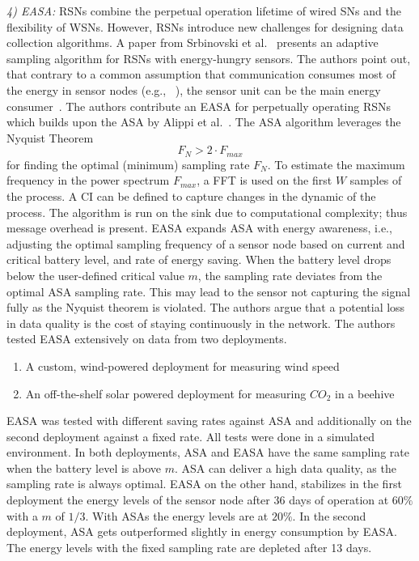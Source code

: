 \textit{4) \ac{EASA}:}
\acp{RSN} combine the perpetual operation lifetime of wired \acp{SN} and the
flexibility of \acp{WSN}. However, \acp{RSN} introduce new challenges for
designing data collection algorithms. A paper from Srbinovski et
al.~\cite{srbinovski2016energy} presents an adaptive sampling algorithm for
\acp{RSN} with energy-hungry sensors. The authors point out, that contrary to a
common assumption that communication consumes most of the energy in sensor
nodes (e.g., ~\cite{santini2006adaptive}), the sensor unit can be the main
energy consumer~\cite{boyle2012energy}. The authors contribute an \ac{EASA} for
perpetually operating \acp{RSN} which builds upon the \ac{ASA} by Alippi et
al.~\cite{alippi2007adaptive}. The \ac{ASA} algorithm leverages the Nyquist
Theorem $$ F_N > 2 \cdot F_{max} $$ for finding the optimal (minimum) sampling
rate $ F_N $. To estimate the maximum frequency in the power spectrum $ F_{max}
$, a \ac{FFT} is used on the first $ W $ samples of the process. A \ac{CI} can
be defined to capture changes in the dynamic of the process. The algorithm is
run on the sink due to computational complexity; thus message overhead is
present. \ac{EASA} expands \ac{ASA} with energy awareness, i.e., adjusting the
optimal sampling frequency of a sensor node based on current and critical
battery level, and rate of energy saving. When the battery level drops below
the user-defined critical value $ m $, the sampling rate deviates from the
optimal \ac{ASA} sampling rate. This may lead to the sensor not capturing the
signal fully as the Nyquist theorem is violated. The authors argue that a
potential loss in data quality is the cost of staying continuously in the
network. The authors tested \ac{EASA} extensively on data from two deployments.

\begin{enumerate}
    \item A custom, wind-powered deployment for measuring wind speed
    \item An off-the-shelf solar powered deployment for measuring $ CO_2 $ in a
    beehive
\end{enumerate}

\ac{EASA} was tested with different saving rates against \ac{ASA} and
additionally on the second deployment against a fixed rate. All tests were done
in a simulated environment. In both deployments, \ac{ASA} and \ac{EASA} have
the same sampling rate when the battery level is above $ m $. \ac{ASA} can
deliver a high data quality, as the sampling rate is always optimal. \ac{EASA}
on the other hand, stabilizes in the first deployment the energy levels of the
sensor node after 36 days of operation at $ 60\% $ with a $ m $ of $ 1/3 $.
With \acp{ASA} the energy levels are at $ 20\% $. In the second deployment,
\ac{ASA} gets outperformed slightly in energy consumption by \ac{EASA}. The
energy levels with the fixed sampling rate are depleted after 13 days.

